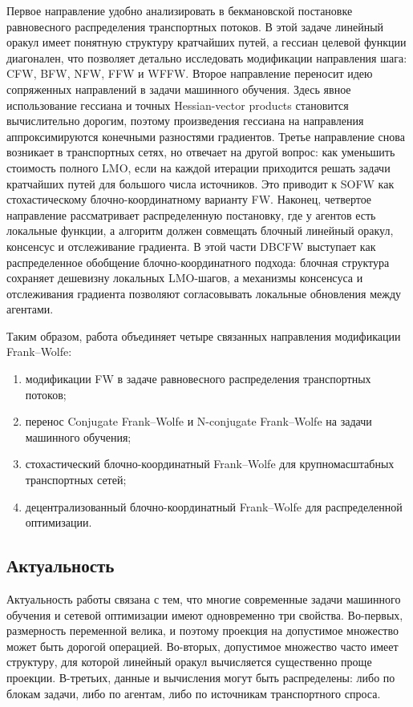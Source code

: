 Первое направление удобно анализировать в бекмановской постановке равновесного распределения
транспортных потоков.
В этой задаче линейный оракул имеет понятную структуру кратчайших путей, а гессиан целевой
функции диагонален, что позволяет детально исследовать модификации направления шага:
CFW, BFW, NFW, FFW и WFFW.
Второе направление переносит идею сопряженных направлений в задачи машинного обучения.
Здесь явное использование гессиана и точных Hessian-vector products становится
вычислительно дорогим, поэтому произведения гессиана на направления аппроксимируются
конечными разностями градиентов.
Третье направление снова возникает в транспортных сетях, но отвечает на другой вопрос:
как уменьшить стоимость полного LMO, если на каждой итерации приходится решать задачи
кратчайших путей для большого числа источников.
Это приводит к SOFW как стохастическому блочно-координатному варианту FW.
Наконец, четвертое направление рассматривает распределенную постановку, где у агентов есть
локальные функции, а алгоритм должен совмещать блочный линейный оракул, консенсус и
отслеживание градиента.
В этой части DBCFW выступает как распределенное обобщение блочно-координатного подхода:
блочная структура сохраняет дешевизну локальных LMO-шагов, а механизмы консенсуса и
отслеживания градиента позволяют согласовывать локальные обновления между агентами.

Таким образом, работа объединяет четыре связанных направления модификации Frank--Wolfe:
\begin{enumerate}
    \item модификации FW в задаче равновесного распределения транспортных потоков;
    \item перенос Conjugate Frank--Wolfe и N-conjugate Frank--Wolfe на задачи машинного обучения;
    \item стохастический блочно-координатный Frank--Wolfe для крупномасштабных транспортных сетей;
    \item децентрализованный блочно-координатный Frank--Wolfe для распределенной оптимизации.
\end{enumerate}

\subsection{Актуальность}

Актуальность работы связана с тем, что многие современные задачи машинного обучения
и сетевой оптимизации имеют одновременно три свойства.
Во-первых, размерность переменной велика, и поэтому проекция на допустимое множество
может быть дорогой операцией.
Во-вторых, допустимое множество часто имеет структуру, для которой линейный оракул
вычисляется существенно проще проекции.
В-третьих, данные и вычисления могут быть распределены: либо по блокам задачи, либо по
агентам, либо по источникам транспортного спроса.

